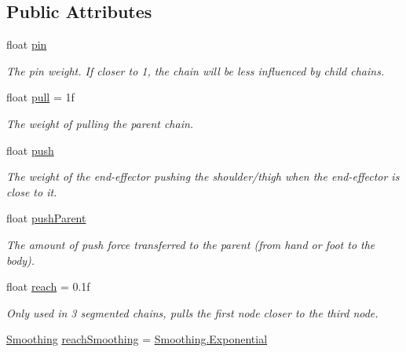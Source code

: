 \subsection*{Public Attributes}
\begin{DoxyCompactItemize}
\item 
float \mbox{\hyperlink{class_root_motion_1_1_final_i_k_1_1_f_b_i_k_chain_a389508e3ea390ab5599169de3f98514b}{pin}}
\begin{DoxyCompactList}\small\item\em The pin weight. If closer to 1, the chain will be less influenced by child chains. \end{DoxyCompactList}\item 
float \mbox{\hyperlink{class_root_motion_1_1_final_i_k_1_1_f_b_i_k_chain_a68367cba3452457c0dea9ed4918f6e62}{pull}} = 1f
\begin{DoxyCompactList}\small\item\em The weight of pulling the parent chain. \end{DoxyCompactList}\item 
float \mbox{\hyperlink{class_root_motion_1_1_final_i_k_1_1_f_b_i_k_chain_a96f80d26536e04e98dfdaca47790f700}{push}}
\begin{DoxyCompactList}\small\item\em The weight of the end-\/effector pushing the shoulder/thigh when the end-\/effector is close to it. \end{DoxyCompactList}\item 
float \mbox{\hyperlink{class_root_motion_1_1_final_i_k_1_1_f_b_i_k_chain_a35344c1d18911c7eb1a38cf636fcc7dd}{push\+Parent}}
\begin{DoxyCompactList}\small\item\em The amount of push force transferred to the parent (from hand or foot to the body). \end{DoxyCompactList}\item 
float \mbox{\hyperlink{class_root_motion_1_1_final_i_k_1_1_f_b_i_k_chain_adb4e385a42a1777f69be173884d6578f}{reach}} = 0.\+1f
\begin{DoxyCompactList}\small\item\em Only used in 3 segmented chains, pulls the first node closer to the third node. \end{DoxyCompactList}\item 
\mbox{\hyperlink{class_root_motion_1_1_final_i_k_1_1_f_b_i_k_chain_a2c75de88180a5922368eaa4c4efb3ac9}{Smoothing}} \mbox{\hyperlink{class_root_motion_1_1_final_i_k_1_1_f_b_i_k_chain_a6e7bc44bee2b83891f598c0db63012ec}{reach\+Smoothing}} = \mbox{\hyperlink{class_root_motion_1_1_final_i_k_1_1_f_b_i_k_chain_a2c75de88180a5922368eaa4c4efb3ac9ac1e19c09f700938f0ff7f1fd4722a3ac}{Smoothing.\+Exponential}}

\end{DoxyCompactItemize}
